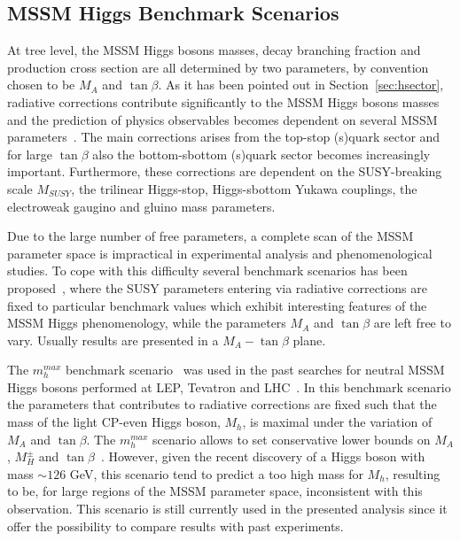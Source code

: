 \subsection{MSSM Higgs Benchmark Scenarios} \label{sec:benchmark}
At tree level, the MSSM  Higgs bosons masses, decay branching fraction and production cross section are all determined by two parameters,
by convention chosen to be $M_A$ and $\tan\beta$. As it has been pointed out in Section~\ref{sec:hsector}, radiative corrections
contribute significantly to the MSSM Higgs bosons masses and the prediction of physics observables becomes 
dependent on several MSSM parameters~\cite{Higgsm5}.
The main corrections arises from the top-stop (s)quark sector and for large $\tan\beta$ also the bottom-sbottom (s)quark sector becomes increasingly 
important. Furthermore, these corrections are dependent on the SUSY-breaking scale $M_{SUSY}$, the trilinear Higgs-stop, 
Higgs-sbottom Yukawa couplings, the electroweak gaugino and gluino mass parameters.

Due to the large number of free parameters, a complete scan of the MSSM parameter space is impractical in experimental analysis and phenomenological
studies. To cope with this difficulty several benchmark scenarios has been proposed~\cite{LHCxsec,mhmax2}, where the SUSY parameters
 entering via radiative corrections 
are fixed to particular benchmark values which exhibit interesting features of the MSSM Higgs phenomenology, while the parameters 
$M_A$ and $\tan\beta$ are left free to vary. Usually results are presented in a $M_A-\tan\beta$ plane.

The $m_h^{max}$ benchmark scenario~\cite{MSSMmhmax} was  used in the past searches for neutral MSSM Higgs bosons performed
at LEP, Tevatron and LHC~\cite{LEPLimits,TevatronLimits1,CMSLimit,ATLASLimit}. 
In this benchmark scenario the parameters that contributes to 
radiative corrections are fixed such that the mass of the light CP-even Higgs boson, 
$M_h$, is maximal under the variation of $M_A$ and $\tan\beta$. The $m_h^{max}$ scenario allows to set conservative 
lower bounds on $M_A$, $M_H^{\pm}$ and $\tan\beta$~\cite{mhmax2}. However, given the recent discovery of a Higgs
boson with mass $\sim 126$ GeV, this scenario
tend to predict a too high mass for $M_h$, resulting to be, for large regions of the MSSM parameter space, 
inconsistent with this observation. This scenario is still currently used in the presented analysis since it offer the possibility to
compare results with past experiments. 

